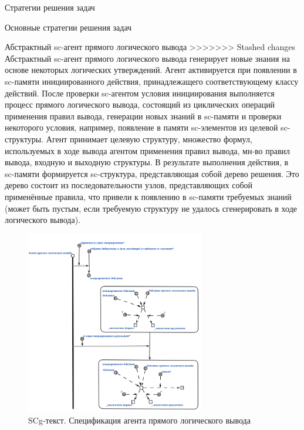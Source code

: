 \begin{frame}{Стратегии решения задач}
\begin{frame}{\large Основные стратегии решения задач}
\begin{textitemize}
\begin{frame}{Абстрактный sc-агент прямого логического вывода}
>>>>>>> Stashed changes
  Абстрактный sc-агент прямого логического вывода генерирует новые знания на основе некоторых логических утверждений. Агент активируется при появлении в sc-памяти инициированного действия, принадлежащего соответствующему классу действий. После проверки sc-агентом условия инициирования выполняется процесс прямого логического вывода, состоящий из циклических операций применения правил вывода, генерации новых знаний в sc-памяти и проверки некоторого условия, например, появление в памяти sc-элементов из целевой sc-структуры. Агент принимает целевую структуру, множество формул, используемых в ходе вывода агентом применения правил вывода, мн-во правил вывода, входную и выходную структуры. В результате выполнения действия, в sc-памяти формируется sc-структура, представляющая собой дерево решения. Это дерево состоит из последовательности узлов, представляющих собой применённые правила, что привели к появлению в sc-памяти требуемых знаний (может быть пустым, если требуемую структуру не удалось сгенерировать в ходе логического вывода).  
\end{frame}

\begin{frame}{}
\begin{figure}[H]
	\caption{SCg-текст. Спецификация агента прямого логического вывода}
	\includegraphics[width=0.9\linewidth, height=8cm]{figures/sc-agents/direct_inference_agent.png}
\end{figure}
\end{frame}


\end{textitemize}
\end{frame}
\end{frame}
